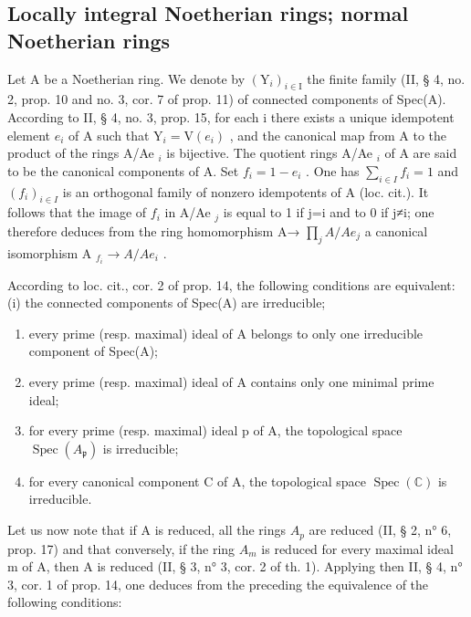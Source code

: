\subsection{Locally integral Noetherian rings; normal Noetherian rings}

Let A be a Noetherian ring. We denote by \((\mathrm{Y}_{i})_{i\in\mathrm{I}}\) the finite family (II, § 4, no. 2, prop. 10 and no. 3, cor. 7 of prop. 11) of connected components of Spec(A). According to II, § 4, no. 3, prop. 15, for each i there exists a unique idempotent element \(e_{i}\) of A such that \(\mathrm{Y}_{i}=\mathrm{V}(e_{i})\) , and the canonical map from A to the product of the rings A/Ae \(_{i}\) is bijective. The quotient rings A/Ae \(_{i}\) of A are said to be the canonical components of A. Set \(f_{i}=1-e_{i}\) . One has \(\sum_{i\in I}f_{i}=1\) and \((f_{i})_{i\in I}\) is an orthogonal family of nonzero idempotents of A (loc. cit.). It follows that the image of \(f_{i}\) in A/Ae \(_{j}\) is equal to 1 if j=i and to 0 if j≠i; one therefore deduces from the ring homomorphism A→ \(\prod_{j}A/Ae_{j}\) a canonical isomorphism A \(_{f_{i}}\rightarrow A/Ae_{i}\) .

According to loc. cit., cor. 2 of prop. 14, the following conditions are equivalent: (i) the connected components of Spec(A) are irreducible;

\begin{enumerate}
\def\labelenumi{(\roman{enumi})}
\setcounter{enumi}{1}
\item
  every prime (resp. maximal) ideal of A belongs to only one irreducible component of Spec(A);
\item
  every prime (resp. maximal) ideal of A contains only one minimal prime ideal;
\item
  for every prime (resp. maximal) ideal p of A, the topological space \(\operatorname{Spec}(A_{\mathfrak{p}})\) is irreducible;
\item
  for every canonical component C of A, the topological space \(\operatorname{Spec}(\mathbb{C})\) is irreducible.
\end{enumerate}

Let us now note that if A is reduced, all the rings \(A_{p}\) are reduced (II, § 2, n° 6, prop. 17) and that conversely, if the ring \(A_{m}\) is reduced for every maximal ideal m of A, then A is reduced (II, § 3, n° 3, cor. 2 of th. 1). Applying then II, § 4, n° 3, cor. 1 of prop. 14, one deduces from the preceding the equivalence of the following conditions:

